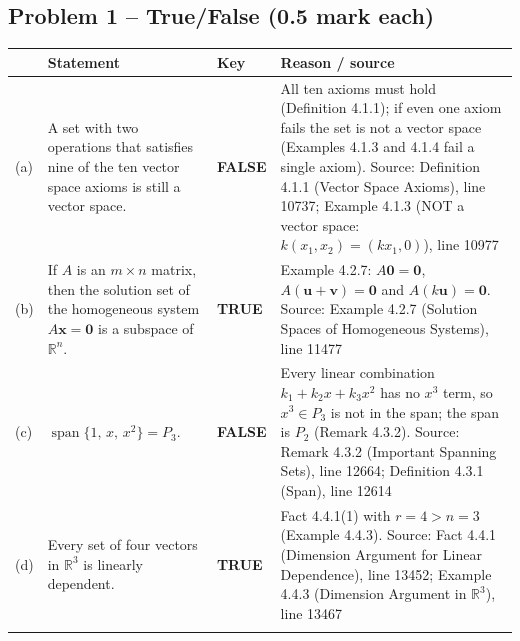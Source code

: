 \documentclass[11pt,a4paper]{article}
\newcommand{\Src}[1]{{\footnotesize\color{black!65}Source: #1}}
\begin{document}
\subsection*{Problem 1 -- True/False (0.5 mark each)}
\begin{tabularx}{\linewidth}{@{}l >{\raggedright\arraybackslash}X l >{\raggedright\arraybackslash}X@{}}\toprule & Statement & Key & Reason / source\\\midrule
(a) & A set with two operations that satisfies nine of the ten vector space axioms is still a vector space. & \textbf{FALSE} & All ten axioms must hold (Definition 4.1.1); if even one axiom fails the set is not a vector space (Examples 4.1.3 and 4.1.4 fail a single axiom). \Src{Definition 4.1.1 (Vector Space Axioms), line 10737; Example 4.1.3 (NOT a vector space: $k(x_1,x_2)=(kx_1,0)$), line 10977}\\\addlinespace
(b) & If $A$ is an $m\times n$ matrix, then the solution set of the homogeneous system $A\mathbf{x}=\mathbf{0}$ is a subspace of $\mathbb{R}^n$. & \textbf{TRUE} & Example 4.2.7: $A\mathbf{0}=\mathbf{0}$, $A(\mathbf{u}+\mathbf{v})=\mathbf{0}$ and $A(k\mathbf{u})=\mathbf{0}$. \Src{Example 4.2.7 (Solution Spaces of Homogeneous Systems), line 11477}\\\addlinespace
(c) & $\operatorname{span}\{1,\,x,\,x^2\}=P_3$. & \textbf{FALSE} & Every linear combination $k_1+k_2x+k_3x^2$ has no $x^3$ term, so $x^3\in P_3$ is not in the span; the span is $P_2$ (Remark 4.3.2). \Src{Remark 4.3.2 (Important Spanning Sets), line 12664; Definition 4.3.1 (Span), line 12614}\\\addlinespace
(d) & Every set of four vectors in $\mathbb{R}^3$ is linearly dependent. & \textbf{TRUE} & Fact 4.4.1(1) with $r=4>n=3$ (Example 4.4.3). \Src{Fact 4.4.1 (Dimension Argument for Linear Dependence), line 13452; Example 4.4.3 (Dimension Argument in $\mathbb{R}^3$), line 13467}\\\addlinespace
\bottomrule\end{tabularx}
\end{document}
